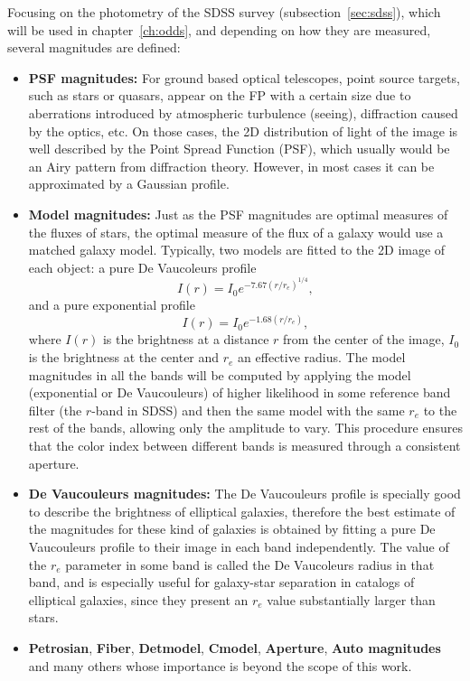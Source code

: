 Focusing on the photometry of the SDSS survey (subsection~\ref{sec:sdss}), which will be used in chapter~\ref{ch:odds}, and depending on how they are measured, several magnitudes are defined:
\begin{itemize}

\item \textbf{PSF magnitudes:} For ground based optical telescopes, point source targets, such as stars or quasars, appear on the FP with a certain size due to aberrations introduced by atmospheric turbulence (seeing), diffraction caused by the optics, etc. On those cases, the 2D distribution of light of the image is well described by the Point Spread Function (PSF), which usually would be an Airy pattern from diffraction theory. However, in most cases it can be approximated by a Gaussian profile.

\item \textbf{Model magnitudes:} Just as the PSF magnitudes are optimal measures of the fluxes of stars, the optimal measure of the flux of a galaxy would use a matched galaxy model. Typically, two models are fitted to the 2D image of each object: a pure De Vaucoleurs profile~\citep{vaucouleurs48}
\begin{equation}
I(r)=I_0 e^{-7.67({r/r_e})^{1/4}},
\end{equation}
and a pure exponential profile 
\begin{equation}
I(r)=I_0 e^{-1.68(r/r_e)},
\end{equation}
where $I(r)$ is the brightness at a distance $r$ from the center of the image, $I_0$ is the brightness at the center and $r_e$ an effective radius. The model magnitudes in all the bands will be computed by applying the model (exponential or De Vaucouleurs) of higher likelihood in some reference band filter (the $r$-band in SDSS) and then the same model with the same $r_e$ to the rest of the bands, allowing only the amplitude to vary. This procedure ensures that the color index between different bands is measured through a consistent aperture.

\item \textbf{De Vaucouleurs magnitudes:} The De Vaucouleurs profile is specially good to describe the brightness of elliptical galaxies, therefore the best estimate of the magnitudes for these kind of galaxies is obtained by fitting a pure De Vaucouleurs profile to their image in each band independently. The value of the $r_e$ parameter in some band is called the De Vaucoleurs radius in that band, and is especially useful for galaxy-star separation in catalogs of elliptical galaxies, since they present an $r_e$ value substantially larger than stars. 

\item \textbf{Petrosian}, \textbf{Fiber}, \textbf{Detmodel}, \textbf{Cmodel}, \textbf{Aperture}, \textbf{Auto magnitudes} and many others whose importance is beyond the scope of this work. 

\end{itemize}


